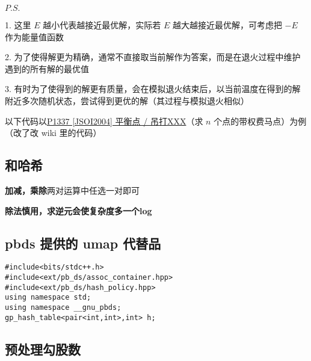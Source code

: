 \documentclass[12pt]{article}
\begin{document}
$P.S.$ 

    \hspace{2em} 1. 这里 $E$ 越小代表越接近最优解，实际若 $E$ 越大越接近最优解，可考虑把 $-E$ 作为能量值函数

    \hspace{2em} 2. 为了使得解更为精确，通常不直接取当前解作为答案，而是在退火过程中维护遇到的所有解的最优值

    \hspace{2em} 3. 有时为了使得到的解更有质量，会在模拟退火结束后，以当前温度在得到的解附近多次随机状态，尝试得到更优的解（其过程与模拟退火相似）

    \hspace{2em} 以下代码以\href{https://www.luogu.com.cn/problem/P1337}{P1337 [JSOI2004] 平衡点 / 吊打XXX}（求 $n$ 个点的带权费马点）为例（改了改 wiki 里的代码）



\newpage

\subsection{和哈希}

\textbf{加减，乘除}两对运算中任选一对即可

\textbf{除法慎用，求逆元会使复杂度多一个log}



\newpage

% 
% 
% 
% 

\subsection{pbds 提供的 umap 代替品}

\begin{lstlisting}[style=C++]
#include<bits/stdc++.h>
#include<ext/pb_ds/assoc_container.hpp>
#include<ext/pb_ds/hash_policy.hpp>
using namespace std;
using namespace __gnu_pbds;
gp_hash_table<pair<int,int>,int> h;
\end{lstlisting}

\subsection{预处理勾股数}
\end{document}
